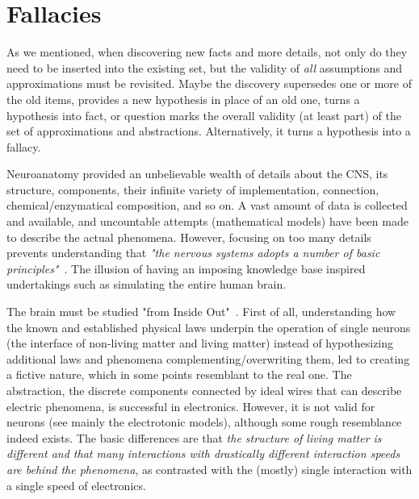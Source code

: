 
\section{Fallacies\label{sec:Physiology-Fallacies}}

As we mentioned, when discovering new facts and more details,
not only do they need to be inserted into the existing set,
but the validity of \textit{all} assumptions and approximations must be revisited.
Maybe the discovery supersedes one or more of the old items,
provides a new hypothesis in place of an old one,
turns a hypothesis into fact,
or question marks the overall validity (at least part) of the set of
approximations and abstractions. Alternatively, it turns a hypothesis into a \hypertarget{PhysiologyFallacy}{fallacy}.


Neuroanatomy provided an unbelievable wealth of details about the
CNS,
its structure, components, their infinite variety of implementation,
connection, chemical/enzymatical composition, and so on.
A vast amount of data is collected and available,
and uncountable attempts (mathematical models) have been made
to describe the actual phenomena. However, focusing on too many details
prevents understanding that \textit{"the nervous systems adopts
a number of basic principles"}~\cite{JohnstonWuNeurophysiology:1995}.
The illusion of having an imposing
knowledge base inspired undertakings such as simulating the entire human brain.

The brain must be studied "from Inside Out"~\cite{BuzsakiTheBrain:2019}.
First of all, understanding how the known and established physical laws
underpin the operation of single neurons (the interface of non-living matter
and living matter) instead of hypothesizing additional laws and phenomena
complementing/overwriting them, led to creating a fictive nature, which in some points
resemblant to the real one. The abstraction, the discrete components connected
by ideal wires that can describe electric phenomena, is successful in electronics. However, it is not valid for neurons (see mainly the electrotonic models),
although some rough resemblance indeed exists.
The basic differences are that  \textit{the structure of living matter is different and
that many interactions with drastically different interaction speeds
are behind the phenomena}, as contrasted with the (mostly) single interaction
with a single speed of electronics.

